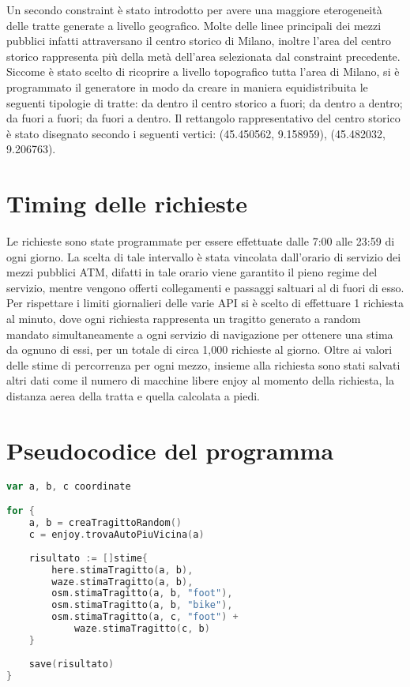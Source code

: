 Un secondo constraint è stato introdotto per avere una maggiore eterogeneità delle tratte generate a livello geografico. Molte delle linee principali dei mezzi pubblici infatti attraversano il centro storico di Milano, inoltre l'area del centro storico rappresenta più della metà dell'area selezionata dal constraint precedente. Siccome è stato scelto di ricoprire a livello topografico tutta l'area di Milano, si è programmato il generatore in modo da creare in maniera equidistribuita le seguenti tipologie di tratte: da dentro il centro storico a fuori; da dentro a dentro; da fuori a fuori; da fuori a dentro. Il rettangolo rappresentativo del centro storico è stato disegnato secondo i seguenti vertici: (45.450562\textdegree, 9.158959\textdegree), (45.482032\textdegree, 9.206763\textdegree).

\section{Timing delle richieste}

Le richieste sono state programmate per essere effettuate dalle 7:00 alle 23:59 di ogni giorno. La scelta di tale intervallo è stata vincolata dall'orario di servizio dei mezzi pubblici ATM, difatti in tale orario viene garantito il pieno regime del servizio, mentre vengono offerti collegamenti e passaggi saltuari al di fuori di esso.
Per rispettare i limiti giornalieri delle varie API si è scelto di effettuare 1 richiesta al minuto, dove ogni richiesta rappresenta un tragitto generato a random mandato simultaneamente a ogni servizio di navigazione per ottenere una stima da ognuno di essi, per un totale di circa 1,000 richieste al giorno. Oltre ai valori delle stime di percorrenza per ogni mezzo, insieme alla richiesta sono stati salvati altri dati come il numero di macchine libere enjoy al momento della richiesta, la distanza aerea della tratta e quella calcolata a piedi. 

\section{Pseudocodice del programma}

\begin{lstlisting}[language=Go]
var a, b, c coordinate

for {
	a, b = creaTragittoRandom()
	c = enjoy.trovaAutoPiuVicina(a)
	
	risultato := []stime{
		here.stimaTragitto(a, b),
		waze.stimaTragitto(a, b),
		osm.stimaTragitto(a, b, "foot"),
		osm.stimaTragitto(a, b, "bike"),
		osm.stimaTragitto(a, c, "foot") +
			waze.stimaTragitto(c, b)
	}
	
	save(risultato)
}
\end{lstlisting}